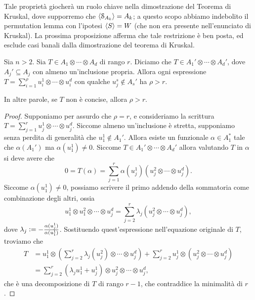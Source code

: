 \begin{remark}
	Tale proprietà giocherà un ruolo chiave nella dimostrazione del Teorema di Kruskal, dove
	supporremo che $ \angb{\s_{A_{k}}} = A_{k} $; a questo scopo abbiamo indebolito il permutation lemma
	con l'ipotesi $ \angb{S} = W $ (che non era presente nell'enunciato di Kruskal). La prossima proposizione afferma che tale
	restrizione è ben posta, ed esclude casi banali dalla dimostrazione del teorema di Kruskal.
\end{remark}

\begin{proposition}
	\label{prop:conc_and_rank}
	Sia $ n>2 $. Sia $ T \in A_1 \otimes \cdots \otimes A_d $ di rango $ r $. Diciamo che $ T \in
		A_1' \otimes \cdots \otimes A_d'$, dove $ A_j' \subseteq A_j $ con almeno un'inclusione propria. Allora
	ogni espressione $ T = \sum_{i=1}^\rho u^1_i \otimes \cdots \otimes u^d_i $ con qualche $ u^s_j
		\notin A_s'$ ha $ \rho > r $.
\end{proposition}
\begin{remark}
	In altre parole, se $ T $ non è concise, allora $ \rho > r $.
\end{remark}
\begin{proof}
	Supponiamo per assurdo che $ \rho = r $, e consideriamo la scrittura $ T = \sum_{j=1}^r u^1_j
		\otimes \cdots \otimes u^d_j $. Siccome
	almeno un'inclusione è stretta, supponiamo senza perdita di generalità che $ u^1_1 \not\in A_{1}'
	$. Allora esiste un funzionale $ \alpha \in A_{1}^* $ tale che $ \alpha(A_{1}') $ ma $
		\alpha(u^1_1) \neq 0 $. Siccome $ T \in A_1' \otimes \cdots \otimes A_{d}'$ allora
	valutando $ T $ in $ \alpha $ si deve avere che
	\begin{equation*}
		0 = T(\alpha) = \sum_{j=1}^r \alpha(u^1_j)(u^2_j \otimes \cdots \otimes u^d_j).
	\end{equation*}
	Siccome $ \alpha(u^1_1) \neq 0 $, possiamo scrivere il primo addendo della sommatoria come combinazione
	degli altri, ossia
	\begin{equation*}
		u^1_1 \otimes u^2_1 \otimes \cdots \otimes u^d_j = \sum_{j=2}^r \lambda_{j}(u^2_j \otimes
		\cdots \otimes u^d_j),
	\end{equation*}
	dove $ \lambda_{j} \vcentcolon= -\frac{\alpha(u^1_j)}{\alpha(u^1_1)} $. Sostituendo quest'espressione
	nell'equazione originale di $ T $, troviamo che
	\begin{equation*}
		\begin{aligned}
			T & = u^1_1 \otimes \left( \sum_{j=2}^r \lambda_{j}(u^2_j) \otimes \cdots \otimes u^d_j
			\right) + \sum_{j=2}^r u^1_j \otimes (u^2_j \otimes \cdots \otimes u^d_j)                 \\
			  & = \sum_{j=2}^r (\lambda_{j}u^1_1 + u^1_j) \otimes u^2_j \otimes \cdots \otimes u^d_j,
		\end{aligned}
	\end{equation*}
	che è una decomposizione di $ T $ di rango $ r - 1 $, che contraddice la minimalità di $ r $.
\end{proof}
